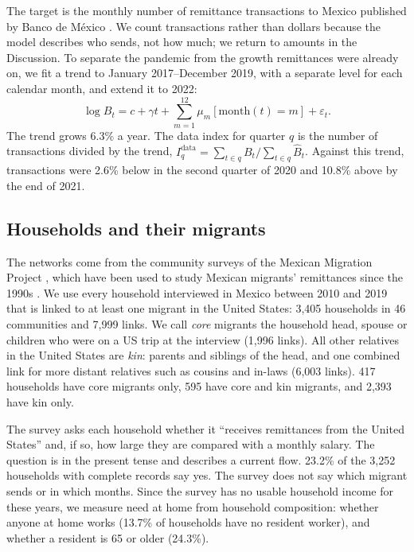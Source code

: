 \documentclass[11pt]{article}
\begin{document}
The target is the monthly number of remittance transactions to Mexico published by Banco de M\'exico \cite{banxico}. We count transactions rather than dollars because the model describes who sends, not how much; we return to amounts in the Discussion. To separate the pandemic from the growth remittances were already on, we fit a trend to January 2017--December 2019, with a separate level for each calendar month, and extend it to 2022:
\begin{equation}
\log B_t = c + \gamma t + \textstyle\sum_{m=1}^{12} \mu_m [\mathrm{month}(t) = m] + \varepsilon_t .
\end{equation}
The trend grows 6.3\% a year. The data index for quarter $q$ is the number of transactions divided by the trend, $I^{\mathrm{data}}_q = \sum_{t \in q} B_t / \sum_{t \in q} \widehat B_t$. Against this trend, transactions were 2.6\% below in the second quarter of 2020 and 10.8\% above by the end of 2021.

\subsection{Households and their migrants}

The networks come from the community surveys of the Mexican Migration Project \cite{mmp}, which have been used to study Mexican migrants' remittances since the 1990s \cite{massey1994migradollars}. We use every household interviewed in Mexico between 2010 and 2019 that is linked to at least one migrant in the United States: 3,405 households in 46 communities and 7,999 links. We call \emph{core} migrants the household head, spouse or children who were on a US trip at the interview (1,996 links). All other relatives in the United States are \emph{kin}: parents and siblings of the head, and one combined link for more distant relatives such as cousins and in-laws (6,003 links). 417 households have core migrants only, 595 have core and kin migrants, and 2,393 have kin only.

The survey asks each household whether it ``receives remittances from the United States'' and, if so, how large they are compared with a monthly salary. The question is in the present tense and describes a current flow. 23.2\% of the 3,252 households with complete records say yes. The survey does not say which migrant sends or in which months. Since the survey has no usable household income for these years, we measure need at home from household composition: whether anyone at home works (13.7\% of households have no resident worker), and whether a resident is 65 or older (24.3\%).
\end{document}
